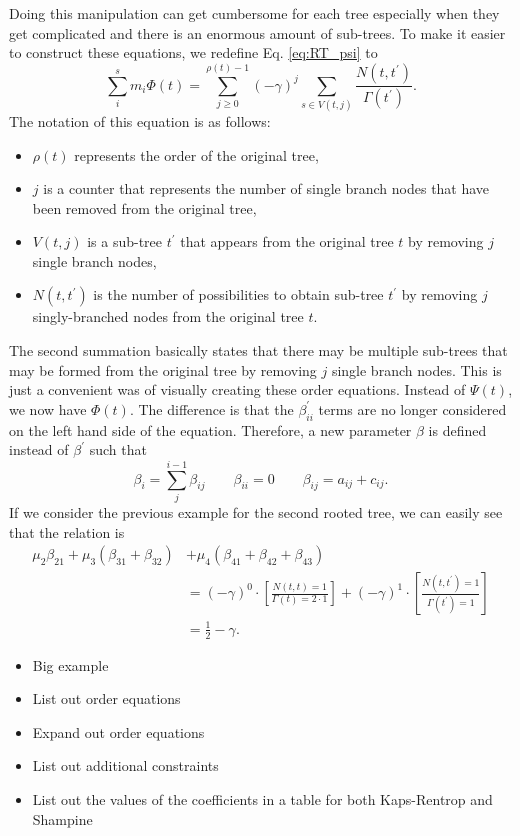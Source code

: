 \documentclass{ansconf}
\numberwithin{equation}{section}
\begin{document}
Doing this manipulation can get cumbersome for each tree especially when they get complicated and there is an enormous amount of sub-trees. To make it easier to construct these equations, we redefine Eq. \eqref{eq:RT_psi} to
\begin{equation}
    \sum_i^s m_i \Phi\left(t\right) = \sum_{j\ge 0}^{\rho\left(t\right)-1} \left(-\gamma\right)^j \sum_{s \in V\left(t,j\right)} \frac{N\left(t,t^\prime\right)}{\Gamma\left(t^\prime\right)}.
\end{equation}
The notation of this equation is as follows:
\begin{itemize}
    \item $\rho\left(t\right)$ represents the order of the original tree,
    \item $j$ is a counter that represents the number of single branch nodes that have been removed from the original tree,
    \item $V\left(t,j\right)$ is a sub-tree $t^\prime$ that appears from the original tree $t$ by removing $j$ single branch nodes,
    \item $N\left(t,t^\prime\right)$ is the number of possibilities to obtain sub-tree $t^\prime$ by removing $j$ singly-branched nodes from the original tree $t$.
\end{itemize}
The second summation basically states that there may be multiple sub-trees that may be formed from the original tree by removing $j$ single branch nodes. This is just a convenient was of visually creating these order equations. Instead of $\Psi\left(t\right)$, we now have $\Phi\left(t\right)$.  The difference is that the $\beta^\prime_{ii}$ terms are no longer considered on the left hand side of the equation. Therefore, a new parameter $\beta$ is defined instead of $\beta^\prime$ such that
\begin{equation}
    \beta_i = \sum_j^{i-1} \beta_{ij} \qquad \beta_{ii} = 0 \qquad \beta_{ij} = a_{ij} + c_{ij}.
\end{equation}
If we consider the previous example for the second rooted tree, we can easily see that the relation is
\begin{align}
    \mu_2\beta_{21} + \mu_3\left(\beta_{31} + \beta_{32} \right) & + \mu_4\left(\beta_{41} + \beta_{42}+ \beta_{43} \right) \\ \nonumber & = \left(-\gamma\right)^0\cdot\left[\frac{N\left(t,t\right) = 1}{\Gamma\left(t\right) = 2\cdot 1}\right] + \left(-\gamma\right)^1\cdot\left[\frac{N\left(t,t^\prime\right) = 1}{\Gamma\left(t^\prime\right) = 1}\right]\\ \nonumber  & = \frac{1}{2} - \gamma .
\end{align}
\begin{itemize}
    \item Big example
    \item List out order equations
    \item Expand out order equations
    \item List out additional constraints
    \item List out the values of the coefficients in a table for both Kaps-Rentrop and Shampine
\end{itemize}
\end{document}
